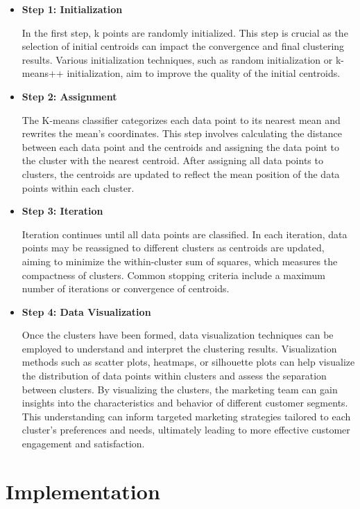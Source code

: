 \documentclass{josis}
\begin{document}
\begin{itemize}
    \item \textbf{Step 1: Initialization}
    
    In the first step, k points are randomly initialized. This step is crucial as the selection of initial centroids can impact the convergence and final clustering results. Various initialization techniques, such as random initialization or k-means++ initialization, aim to improve the quality of the initial centroids.
    
    \item \textbf{Step 2: Assignment}
    
    The K-means classifier categorizes each data point to its nearest mean and rewrites the mean's coordinates. This step involves calculating the distance between each data point and the centroids and assigning the data point to the cluster with the nearest centroid. After assigning all data points to clusters, the centroids are updated to reflect the mean position of the data points within each cluster.
    
    \item \textbf{Step 3: Iteration}
    
    Iteration continues until all data points are classified. In each iteration, data points may be reassigned to different clusters as centroids are updated, aiming to minimize the within-cluster sum of squares, which measures the compactness of clusters. Common stopping criteria include a maximum number of iterations or convergence of centroids.
    
    \item \textbf{Step 4: Data Visualization}
    
    Once the clusters have been formed, data visualization techniques can be employed to understand and interpret the clustering results. Visualization methods such as scatter plots, heatmaps, or silhouette plots can help visualize the distribution of data points within clusters and assess the separation between clusters. By visualizing the clusters, the marketing team can gain insights into the characteristics and behavior of different customer segments. This understanding can inform targeted marketing strategies tailored to each cluster's preferences and needs, ultimately leading to more effective customer engagement and satisfaction.
\end{itemize}



\section{Implementation}
\end{document}
